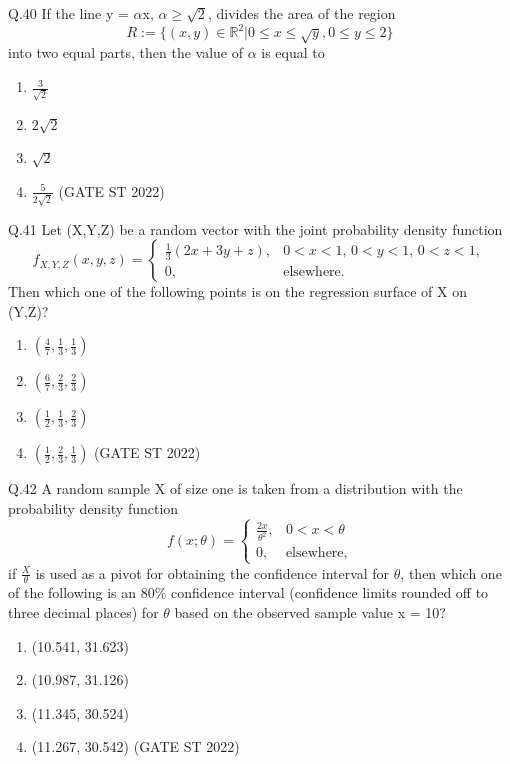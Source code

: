 \documentclass[journal,12pt,onecolumn]{IEEEtran}
\theoremstyle{remark}
\begin{document}
	\vspace{2em}
Q.40 If the line y = $\alpha$x, $\alpha \geq \sqrt{2}$, divides the area of the region 
\[
R:= \{(x,y) \in \mathbb{R}^2|0 \leq x \leq \sqrt{y}, 0 \leq y \leq 2\}
\]
into two equal parts, then the value of $\alpha$ is equal to
\begin{enumerate}[label=\alph*.] 
	\item $\frac{3}{\sqrt{2}}$
	\item $2\sqrt{2}$
	\item $\sqrt{2}$
	\item $\frac{5}{2\sqrt{2}}$
	\hfill (GATE ST 2022)
\end{enumerate}
	\vspace{2em}
Q.41 Let (X,Y,Z) be a random vector with the joint probability density function
\[
f_{X,Y,Z}(x,y,z) = 
\begin{cases}
	\frac{1}{3} (2x + 3y + z), & 0 < x < 1,\, 0 < y < 1,\, 0 < z < 1, \\
	0, & \text{elsewhere}.
\end{cases}
\]
Then which one of the following points is on the regression surface of X on (Y,Z)?
\begin{enumerate}[label=\Alph*.] 
	\item $( \frac{4}{7}, \frac{1}{3}, \frac{1}{3} )$
	\item $( \frac{6}{7}, \frac{2}{3}, \frac{2}{3} )$
	\item $(\frac{1}{2},\frac{1}{3},\frac{2}{3})$
	\item $(\frac{1}{2},\frac{2}{3},\frac{1}{3})$
	\hfill (GATE ST 2022)
\end{enumerate}
	\vspace{2em}
Q.42 A random sample X of size one is taken from a distribution with the probability density function 
\[
f(x; \theta) = \begin{cases}
	\frac{2x}{\theta^2}, & 0 < x < \theta \\
	0, & \text{elsewhere},
\end{cases}
\]
if $\frac{X}{\theta}$ is used as a pivot for obtaining the confidence interval for $\theta$, then which one of the following is an 80\% confidence interval (confidence limits rounded off to three decimal places) for $\theta$ based on the observed sample value x = 10?
\begin{enumerate}[label=\Alph*.] 
	\item (10.541, 31.623)
	\item (10.987, 31.126)
	\item (11.345, 30.524)
	\item (11.267, 30.542)
	\hfill (GATE ST 2022)
\end{enumerate}
\end{document}

